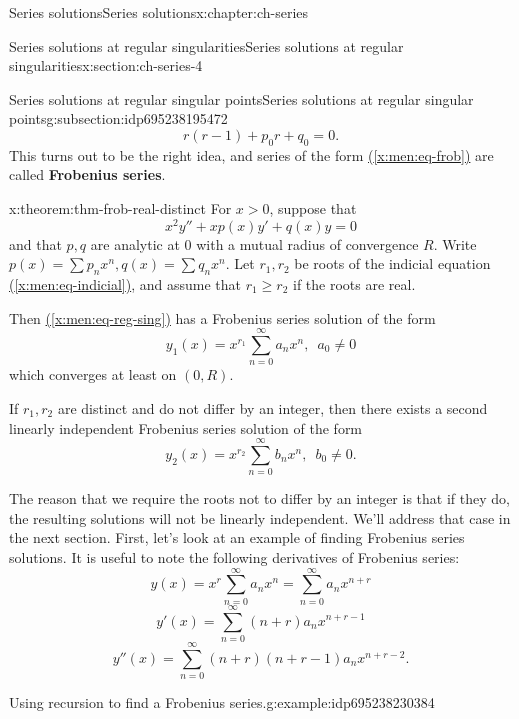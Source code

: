 \documentclass[oneside,10pt,]{book}
\newcommand{\xreffont}{\relax}
\newcommand{\terminology}[1]{\textbf{#1}}
\numberwithin{equation}{section}
\numberwithin{equation}{section}
\begin{document}
\begin{chapterptx}{Series solutions}{}{Series solutions}{}{}{x:chapter:ch-series}
\begin{sectionptx}{Series solutions at regular singularities}{}{Series solutions at regular singularities}{}{}{x:section:ch-series-4}
\begin{subsectionptx}{Series solutions at regular singular points}{}{Series solutions at regular singular points}{}{}{g:subsection:idp695238195472}
\begin{equation*}
r(r-1) + p_0 r + q_0 = 0.
\end{equation*}
This turns out to be the right idea, and series of the form \hyperref[x:men:eq-frob]{({\xreffont\ref{x:men:eq-frob}})} are called \terminology{Frobenius series}.%
\begin{theorem}{}{}{x:theorem:thm-frob-real-distinct}%
For \(x > 0\), suppose that%
\begin{equation}
x^2 y'' + xp(x)y' + q(x)y = 0\label{x:men:eq-reg-sing}
\end{equation}
and that \(p, q\) are analytic at 0 with a mutual radius of convergence \(R\). Write \(p(x) = \sum p_n x^n, q(x) = \sum q_n x^n\). Let \(r_1, r_2\) be roots of the indicial equation \hyperref[x:men:eq-indicial]{({\xreffont\ref{x:men:eq-indicial}})}, and assume that \(r_1 \geq r_2\) if the roots are real.%
\par
Then \hyperref[x:men:eq-reg-sing]{({\xreffont\ref{x:men:eq-reg-sing}})} has a Frobenius series solution of the form%
\begin{equation*}
y_1(x) = x^{r_1} \sum_{n=0}^\infty a_n x^n, \,\,\, a_0 \neq 0
\end{equation*}
which converges at least on \((0,R)\).%
\par
If \(r_1, r_2\) are distinct and do not differ by an integer, then there exists a second linearly independent Frobenius series solution of the form%
\begin{equation*}
y_2(x) = x^{r_2} \sum_{n=0}^\infty b_n x^n, \,\,\, b_0 \neq 0.
\end{equation*}
%
\end{theorem}
The reason that we require the roots not to differ by an integer is that if they do, the resulting solutions will not be linearly independent. We'll address that case in the next section. First, let's look at an example of finding Frobenius series solutions. It is useful to note the following derivatives of Frobenius series:%
\begin{equation*}
y(x) = x^r \sum_{n=0}^\infty a_n x^n = \sum_{n=0}^\infty a_n x^{n + r}
\end{equation*}
%
\begin{equation}
y'(x) = \sum_{n=0}^\infty (n+r) a_n x^{n + r - 1}\label{x:men:eq-frob-first}
\end{equation}
%
\begin{equation}
y''(x) = \sum_{n=0}^\infty (n+r)(n+r - 1) a_n x^{n + r - 2}.\label{x:men:eq-frob-second}
\end{equation}
%
\begin{example}{Using recursion to find a Frobenius series.}{g:example:idp695238230384}%

\end{example}
\end{subsectionptx}
\end{sectionptx}
\end{chapterptx}
\end{document}

